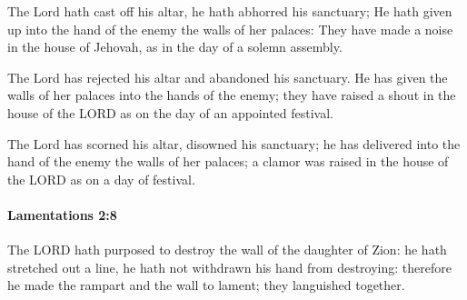 			\begin{versebox}
					\item[BHS] 
					\item[LXX] 
					\item[ASV] The Lord hath cast off his altar, he hath abhorred his sanctuary; He hath given up into the hand of the enemy the walls of her palaces: They have made a noise in the house of Jehovah, as in the day of a solemn assembly.
					\item[NIV] The Lord has rejected his altar and abandoned his sanctuary. He has given the walls of her palaces into the hands of the enemy; they have raised a shout in the house of the LORD as on the day of an appointed festival.
					\item[NRSV] The Lord has scorned his altar, disowned his sanctuary; he has delivered into the hand of the enemy the walls of her palaces; a clamor was raised in the house of the LORD as on a day of festival.
			\end{versebox}

		\paragraph{Lamentations 2:8} %
			\label{LAMENTATIONS-2-8}

			The LORD hath purposed to destroy the wall of the daughter of Zion: he hath stretched out a line, he hath not withdrawn his hand from destroying: therefore he made the rampart and the wall to lament; they languished together.

